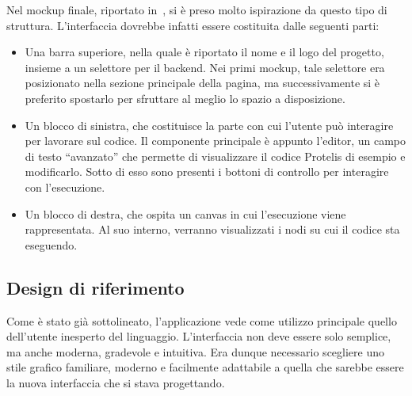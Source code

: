       Nel mockup finale, riportato in~, si è preso molto ispirazione da questo tipo di struttura.
      L'interfaccia dovrebbe infatti essere costituita dalle seguenti parti:

      \begin{itemize}
        \item
          Una barra superiore, nella quale è riportato il nome e il logo del progetto, insieme a un selettore per il backend.
          Nei primi mockup, tale selettore era posizionato nella sezione principale della pagina, ma successivamente si è preferito spostarlo per sfruttare al meglio lo spazio a disposizione.
        \item
          Un blocco di sinistra, che costituisce la parte con cui l'utente può interagire per lavorare sul codice.
          Il componente principale è appunto l'editor, un campo di testo ``avanzato'' che permette di visualizzare il codice Protelis di esempio e modificarlo.
          Sotto di esso sono presenti i bottoni di controllo per interagire con l'esecuzione.
        \item
          Un blocco di destra, che ospita un canvas in cui l'esecuzione viene rappresentata.
          Al suo interno, verranno visualizzati i nodi su cui il codice sta eseguendo.
      \end{itemize}

    \subsection{Design di riferimento}\label{subsec:material}
      Come è stato già sottolineato, l'applicazione vede come utilizzo principale quello dell'utente inesperto del linguaggio.
      L'interfaccia non deve essere solo semplice, ma anche moderna, gradevole e intuitiva.
      Era dunque necessario scegliere uno stile grafico familiare, moderno e facilmente adattabile a quella che sarebbe essere la nuova interfaccia che si stava progettando.

